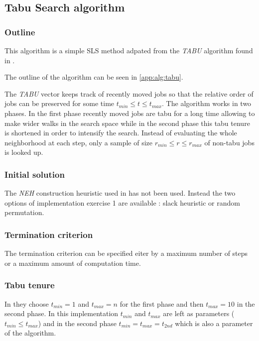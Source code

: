 \subsection{Tabu Search algorithm}
\label{impl:tabu}

\subsubsection{Outline}

This algorithm is a simple SLS method adpated from the \emph{TABU} algorithm found in \cite{santostabu}.

The outline of the algorithm can be seen in \ref{app:alg:tabu}.

The \emph{TABU} vector keeps track of recently moved jobs so that the relative order of jobs can be preserved for some time $t_{min} \leq t \leq t_{max}$. The algorithm works in two phases. In the first phase recently moved jobs are tabu for a long time allowing to make wider walks in the search space while in the second phase this tabu tenure is shortened in order to intensify the search. Instead of evaluating the whole neighborhood at each step, only a sample of size $r_{min} \leq r \leq r_{max}$ of non-tabu jobs is looked up.

\subsubsection{Initial solution}

The \emph{NEH} construction heuristic used in \cite{santostabu} has not been used. Instead the two options of implementation exercise 1 are available : slack heuristic or random permutation.


\subsubsection{Termination criterion}

The termination criterion can be specified eiter by a maximum number of steps or a maximum amount of computation time.

\subsubsection{Tabu tenure}

In \cite{santostabu} they choose $t_{min} = 1$ and $t_{max} = n$ for the first phase and then $t_{max} = 10$ in the second phase. In this implementation $t_{min}$ and $t_{max}$ are left as parameters ($t_{min} \leq t_{max}$) and in the second phase $t_{min} = t_{max} = t_{2nd}$ which is also a parameter of the algorithm.

